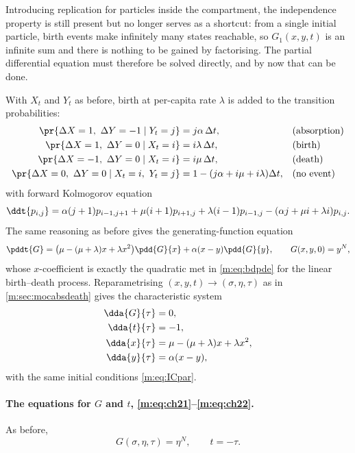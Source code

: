 Introducing replication for particles inside the compartment, the independence
property is still present but no longer serves as a shortcut: from a single initial
particle, birth events make infinitely many states reachable, so $G_1(x,y,t)$ is an
infinite sum and there is nothing to be gained by factorising. The partial
differential equation must therefore be solved directly, and by now that can be
done.

With $X_t$ and $Y_t$ as before, birth at per-capita rate $\lambda$ is added to the
transition probabilities:
\begin{align*}
\pr{\Delta X = 1,\ \Delta Y = -1 \mid Y_t=j} &= j\alpha\,\Delta t, &&\text{(absorption)}\\
\pr{\Delta X = 1,\ \Delta Y = 0 \mid X_t=i} &= i\lambda\,\Delta t, &&\text{(birth)}\\
\pr{\Delta X = -1,\ \Delta Y = 0 \mid X_t=i} &= i\mu\,\Delta t, &&\text{(death)}\\
\pr{\Delta X = 0,\ \Delta Y = 0 \mid X_t=i,\ Y_t=j} &= 1-(j\alpha+i\mu+i\lambda)\Delta t, &&\text{(no event)}
\end{align*}
with forward Kolmogorov equation
\begin{equation}
\label{m:eq:FK3}
\ddt{p_{i,j}} = \alpha(j+1)p_{i-1,j+1} + \mu(i+1)p_{i+1,j} + \lambda(i-1)p_{i-1,j}
- (\alpha j+\mu i+\lambda i)p_{i,j} .
\end{equation}
The same reasoning as before gives the generating-function equation
\begin{equation}
\label{m:eq:PDE3}
\pddt{G} = \bigl(\mu-(\mu+\lambda)x+\lambda x^2\bigr)\pdd{G}{x} + \alpha(x-y)\pdd{G}{y},
\qquad G(x,y,0)=y^N ,
\end{equation}
whose $x$-coefficient is exactly the quadratic met in \cref{m:eq:bdpde} for the
linear birth--death process. Reparametrising $(x,y,t)\to(\sigma,\eta,\tau)$ as in
\cref{m:sec:mocabsdeath} gives the characteristic system
\begin{align}
\dda{G}{\tau} &= 0, \label{m:eq:ch21}\\
\dda{t}{\tau} &= -1, \label{m:eq:ch22}\\
\dda{x}{\tau} &= \mu-(\mu+\lambda)x+\lambda x^2, \label{m:eq:ch23}\\
\dda{y}{\tau} &= \alpha(x-y), \label{m:eq:ch24}
\end{align}
with the same initial conditions \cref{m:eq:ICpar}.

\paragraph{The equations for $G$ and $t$, \eqref{m:eq:ch21}--\eqref{m:eq:ch22}.}
As before,
\begin{equation}
\label{m:eq:GetaN2}
G(\sigma,\eta,\tau) = \eta^N,
\qquad
t = -\tau .
\end{equation}

